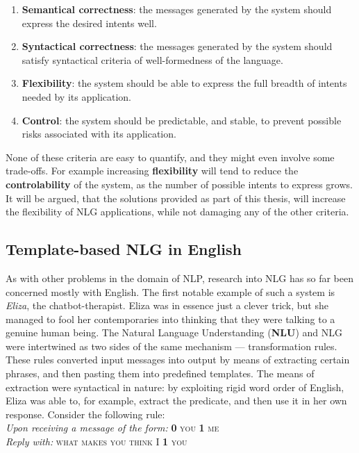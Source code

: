 \documentclass[12pt]{article}
\begin{document}
\begin{enumerate}
\item \textbf{Semantical correctness}: the messages generated by the system should express the desired intents well.
\item \textbf{Syntactical correctness}: the messages generated by the system should satisfy syntactical criteria of well-formedness of the language.
\item \textbf{Flexibility}: the system should be able to express the full breadth of intents needed by its application. 
\item \textbf{Control}: the system should be predictable, and stable, to prevent possible risks associated with its application.
\end{enumerate}

None of these criteria are easy to quantify, and they might even involve some trade-offs. For example increasing \textbf{flexibility} will tend to reduce the \textbf{controlability} of the system, as the number of possible intents to express grows. It will be argued, that the solutions provided as part of this thesis, will increase the flexibility of NLG applications, while not damaging any of the other criteria.

\subsection{Template-based NLG in English}
As with other problems in the domain of NLP, research into NLG has so far been concerned mostly with English. The first notable example of such a system is \textit{Eliza}\cite{weizenbaum:1966}, the chatbot-therapist. Eliza was in essence just a clever trick, but she managed to fool her contemporaries into thinking that they were talking to a genuine human being. The Natural Language Understanding (\textbf{NLU}) and NLG were intertwined as two sides of the same mechanism --- transformation rules. These rules converted input messages into output by means of extracting certain phrases, and then pasting them into predefined templates. The means of extraction were syntactical in nature: by exploiting rigid word order of English, Eliza was able to, for example, extract the predicate, and then use it in her own response. Consider the following rule:\\

\textit{Upon receiving a message of the form:} \textsc{\textbf{0} you \textbf{1} me}\\

\textit{Reply with:} \textsc{what makes you think I \textbf{1} you}\\
\end{document}
